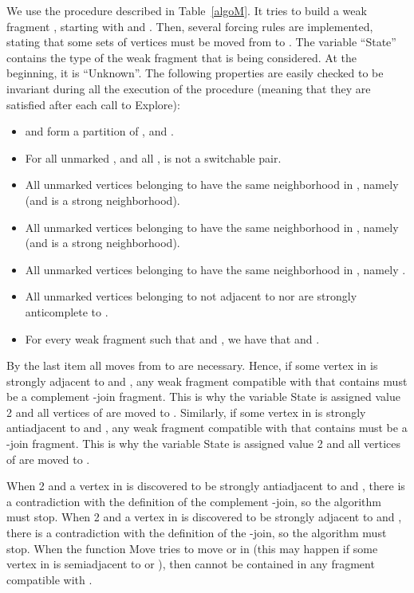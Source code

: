 \documentclass[11 pt] {article}
\begin{document}
We use the procedure described in Table~\ref{algoM}.  It
tries to build a weak fragment , starting with  and .  Then,
several forcing rules are implemented, stating that some sets of
vertices must be moved from  to .  The variable ``State''
contains the type of the weak fragment that is being considered.  At the
beginning, it is ``Unknown''.   The following
properties are easily checked to be invariant during all the
execution of the procedure (meaning that they are satisfied after each
call to Explore):

\begin{itemize}
\item  and  form a partition of ,  and
  .

\item For all unmarked , and all ,  is not a
  switchable pair.  

\item All unmarked vertices belonging to  have the same neighborhood in , namely 
  (and  is a strong neighborhood).

\item All unmarked vertices belonging to  have the same neighborhood in , namely  (and 
  is a strong neighborhood).

\item All unmarked vertices belonging to  have the same neighborhood in , namely .

\item All unmarked  vertices belonging to  not adjacent to  
nor  are strongly anticomplete to .

\item For every weak fragment  such that  and
  , we have that  and
  .
\end{itemize}

By the last item all moves from  to  are necessary.  Hence, if
some vertex in  is strongly adjacent to  and , any weak
fragment compatible with  that contains  must be a complement
-join fragment.  This is why the variable State is assigned value
2 and all vertices of  are moved to .  Similarly, if some vertex in  is strongly
antiadjacent to  and , any weak fragment compatible with 
that contains  must be a -join fragment.  This is why the variable
State is assigned value 2 and all vertices of  are moved to .

When 2 and a vertex in  is
discovered to be strongly antiadjacent to  and , there is a
contradiction with the definition of the complement -join, so the
algorithm must stop.  When 2 and a vertex
in  is discovered to be strongly adjacent to  and , there
is a contradiction with the definition of the -join, so the
algorithm must stop.  When the function Move tries to move  or
 in  (this may happen if some vertex in  is semiadjacent to 
or ), then  cannot be contained in any
fragment compatible with .
\end{document}
